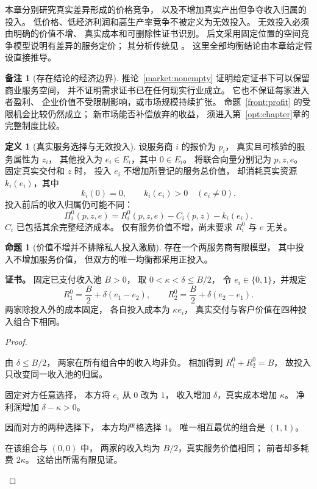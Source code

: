 \documentclass[UTF8,12pt,a4paper,openany,fontset=none,zihao=false]{ctexrep}
\theoremstyle{definition}
\newtheorem{definition}{定义}[chapter]
\newtheorem{proposition}{命题}[chapter]
\newtheorem{remark}{备注}[chapter]
\newenvironment{certificate}{\par\noindent\textbf{证书。}\ignorespaces}{\par}
\newcommand{\1}{\mathbf 1}
\begin{document}
本章分别研究真实差异形成的价格竞争，
以及不增加真实产出但争夺收入归属的投入。
低价格、低经济利润和高生产率竞争不被定义为无效投入。
无效投入必须由明确的价值不增、
真实成本和可删除性证书识别。
后文采用固定位置的空间竞争模型说明有差异的服务定价；
其分析传统见 \cite{Hotelling1929}。
这里全部均衡结论由本章给定假设直接推导。

\begin{remark}[存在结论的经济边界]
推论~\ref{market:nonempty} 证明给定证书下可以保留商业服务空间，
并不证明需求证书已在任何现实行业成立。
它也不保证每家进入者盈利、
企业价值不受限制影响，或市场规模持续扩张。
命题~\ref{front:profit} 的受限机会比较仍然成立；
新市场能否补偿放弃的收益，
须进入第~\ref{opt:chapter}章的完整制度比较。
\end{remark}

\begin{definition}[真实服务选择与无效投入]
\label{comp:effort-data}
设服务商 \(i\) 的报价为 \(p_i\)，
真实且可核验的服务属性为 \(z_i\)，
其他投入为 \(e_i\in E_i\)，其中 \(0\in E_i\)。
将联合向量分别记为 \(p,z,e\)。
固定真实交付和 \(z\) 时，
投入 \(e_i\) 不增加所登记的服务总价值，
却消耗真实资源 \(k_i(e_i)\)，其中
\[
 k_i(0)=0,\qquad k_i(e_i)>0\quad(e_i\ne0).
\]
投入前后的收入归属仍可能不同：
\[
 \Pi_i^0(p,z,e)
 =R_i^0(p,z,e)-C_i(p,z)-k_i(e_i).
\]
\(C_i\) 已包括其余完整经济成本。
仅有服务价值不增，尚未要求 \(R_i^0\) 与 \(e\) 无关。
\end{definition}

\begin{proposition}[价值不增并不排除私人投入激励]
\label{comp:rent-example}
存在一个两服务商有限模型，
其中投入不增加服务价值，
但双方的唯一均衡都采用正投入。
\end{proposition}
\begin{certificate}
固定已支付收入池 \(B>0\)，
取 \(0<\kappa<\delta\le B/2\)，
令 \(e_i\in\{0,1\}\)，并规定
\[
 R_1^0=\frac B2+\delta(e_1-e_2),\qquad
 R_2^0=\frac B2+\delta(e_2-e_1).
\]
两家除投入外的成本固定，
各自投入成本为 \(\kappa e_i\)，
真实交付与客户价值在四种投入组合下相同。
\end{certificate}
\begin{proof}
\begin{semanticsteps}
\item 由 \(\delta\le B/2\)，
两家在所有组合中的收入均非负。
相加得到 \(R_1^0+R_2^0=B\)，
故投入只改变同一收入池的归属。
\item 固定对方任意选择，
本方将 \(e_i\) 从 \(0\) 改为 \(1\)，
收入增加 \(\delta\)，真实成本增加 \(\kappa\)。
净利润增加 \(\delta-\kappa>0\)。
\item 因而对方的两种选择下，
本方均严格选择 \(1\)。
唯一相互最优的组合是 \((1,1)\)。
\item 在该组合与 \((0,0)\) 中，
两家的收入均为 \(B/2\)，真实服务价值相同；
前者却多耗费 \(2\kappa\)。
这给出所需有限见证。
\end{semanticsteps}
\end{proof}
\end{document}
